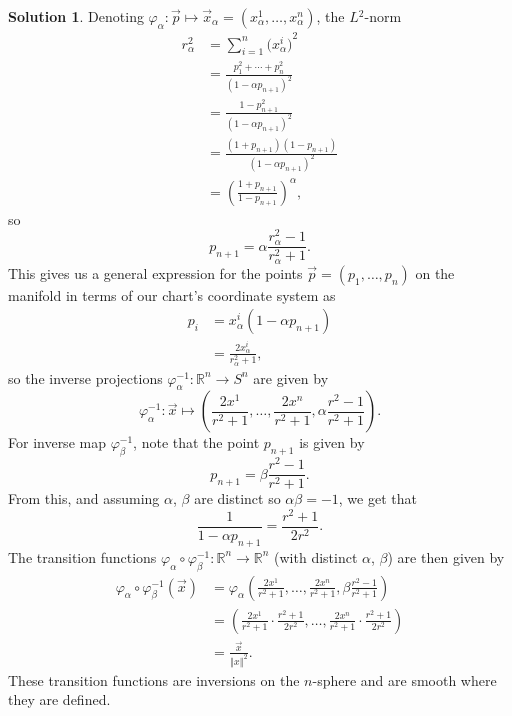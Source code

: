 \documentclass[11pt, a4paper]{report}
\theoremstyle{definition}
\newtheorem{solution}{Solution}[part]
\newenvironment{sol}{\begin{solution}}{\end{solution}\pagebreak[3]}
\newcommand*{\norm}[1]{\ensuremath{\left\Vert#1\right\Vert}}
\begin{document}
\begin{sol}
Denoting $\varphi_\alpha: \vec{p} \mapsto \vec{x}_\alpha = \left(x_\alpha^1, \ldots, x_\alpha^n\right)$, the $L\!^2$-norm
\begin{align*}
    r_\alpha^2 &= \sum_{i = 1}^n {\bigl( x_\alpha^i \bigr)}^2 \\
               &= \frac{p_1^2 + \cdots + p_n^2}{{(1 - \alpha p_{n + 1})}^2} \\
               &= \frac{1 - p_{n + 1}^2}{{(1 - \alpha p_{n + 1})}^2} \\
               &= \frac{(1 + p_{n + 1})(1 - p_{n + 1})}{{(1 - \alpha p_{n + 1})}^2} \\
               &= {\left(\frac{1 + p_{n + 1}}{1 - p_{n + 1}}\right)}^\alpha,
\end{align*}
so
\[
    p_{n + 1} = \alpha\frac{r_\alpha^2 - 1}{r_\alpha^2 + 1}.
\]
This gives us a general expression for the points $\vec{p} = (p_1, \ldots, p_n)$ on the manifold in terms of our chart's coordinate system as
\begin{align*}
    p_i &= x_\alpha^i (1 - \alpha p_{n + 1}) \\
        &= \frac{2 x_\alpha^i}{r_\alpha^2 + 1},
\end{align*}
so the inverse projections $\varphi_\alpha^{-1}: \mathbb{R}^n \to S^n$ are given by
\[
    \varphi_\alpha^{-1}: \vec{x} \mapsto \left(\frac{2 x^1}{r^2 + 1}, \ldots, \frac{2 x^n}{r^2 + 1}, \alpha \frac{r^2 - 1}{r^2 + 1} \right).
\]
For inverse map $\varphi_\beta^{-1}$, note that the point $p_{n + 1}$ is given by
\[
    p_{n + 1} = \beta \frac{r^2 - 1}{r^2 + 1}.
\]
From this, and assuming $\alpha$, $\beta$ are distinct so $\alpha \beta = -1$, we get that
\[
    \frac{1}{1 - \alpha p_{n + 1}} = \frac{r^2 + 1}{2 r^2}.
\]
The transition functions $\varphi_\alpha \circ \varphi_\beta^{-1}: \mathbb{R}^n \to \mathbb{R}^n$ (with distinct $\alpha$, $\beta$) are then given by
\begin{align*}
    \varphi_\alpha \circ \varphi_\beta^{-1} (\vec{x}) &= \varphi_\alpha \left(\frac{2 x^1}{r^2 + 1}, \ldots, \frac{2 x^n}{r^2 + 1}, \beta \frac{r^2 - 1}{r^2 + 1} \right) \\
        &= \left(\frac{2 x^1}{r^2 + 1} \cdot \frac{r^2 + 1}{2 r^2},
                 \ldots,
                 \frac{2 x^n}{r^2 + 1} \cdot \frac{r^2 + 1}{2 r^2}
            \right) \\
        &= \frac{\vec{x}}{\norm{x}^2}.
\end{align*}
These transition functions are inversions on the $n$-sphere and are smooth where they are defined.

\end{sol}
\end{document}

